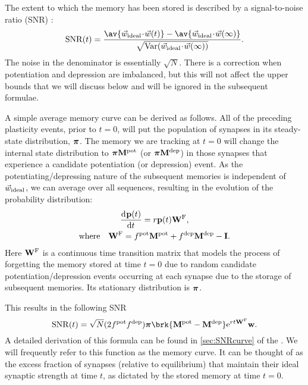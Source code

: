 The extent to which the memory has been stored is described by a signal-to-noise ratio (SNR) \cite{Fusi2005cascade,Fusi2007multistate}:
%
\begin{equation}\label{eq:SNRdef}
  \snr(t) = \frac{\av{\wv_\text{ideal}\cdt\wv(t)} - \av{\wv_\text{ideal}\cdt\wv(\infty)}}
     {\sqrt{\var(\wv_\text{ideal}\cdt\wv(\infty))}}.
\end{equation}
%
The noise in the denominator is essentially $\sqrt{N}$.
There is a correction when potentiation and depression are imbalanced, but this will not affect the upper bounds that we will discuss below and will be ignored in the subsequent formulae.

A simple average memory curve can be derived as follows.
All of the preceding plasticity events, prior to $t=0$, will put the population of synapses in its steady-state distribution, $\boldsymbol{\pi}$.
The memory we are tracking at $t=0$ will change the internal state distribution to $\boldsymbol{\pi}\mathbf{M}^{\text{pot}}$ (or $\boldsymbol{\pi}\mathbf{M}^{\text{dep}}$) in those synapses that experience a candidate potentiation (or depression) event.
As the potentiating/depressing nature of the subsequent memories is independent of $\vec{w}_\text{ideal}$, we can average over all sequences, resulting in the evolution of the probability distribution:
%
\begin{multline}\label{eq:evol}
  \frac{\mathrm{d}^{} \mathbf{p}(t)}{\mathrm{d}{t}^{}} = r\mathbf{p}(t)\mathbf{W}^{\mathrm{F}},
  \\ \text{where} \quad
  \mathbf{W}^{\mathrm{F}} = f^{\text{pot}}\mathbf{M}^{\text{pot}} + f^{\text{dep}}\mathbf{M}^{\text{dep}} - \mathbf{I}.
\end{multline}
%
Here $\mathbf{W}^{\mathrm{F}}$ is a continuous time transition matrix that models the process of forgetting the memory stored at time $t=0$ due to random candidate potentiation/depression events occurring at each synapse due to the storage of subsequent memories.
Its stationary distribution is $\boldsymbol{\pi}$.


This results in the following SNR
%
\begin{equation}\label{eq:SNRcalc}
  \snr(t) = \sqrt{N}(2 f\pot f\dep) \eq \brk{\M\pot-\M\dep} \e^{rt\frg} \w.
\end{equation}
%
A detailed derivation of this formula can be found in \cref{sec:SNRcurve} of the \supp.
We will frequently refer to this function as the memory curve.
It can be thought of as the excess fraction of synapses (relative to equilibrium) that maintain their ideal synaptic strength at time $t$, as dictated by the stored memory at time $t=0$.


